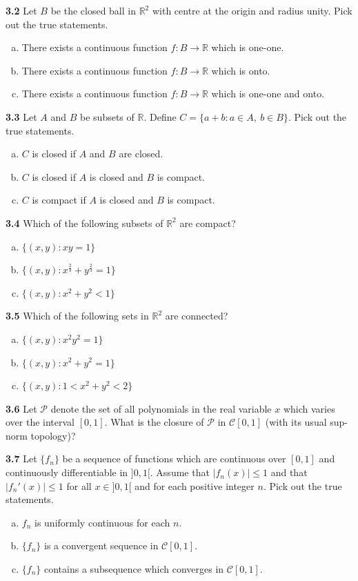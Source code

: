 \documentclass[11pt,a4paper]{article}
\newcommand{\R}{\mathbb{R}}
\newcommand{\qitem}[1]{\par\medskip\noindent\textbf{#1}\hspace{0.5em}}
\begin{document}
\qitem{3.2} Let $B$ be the closed ball in $\R^2$ with centre at the origin and radius unity. Pick out the true statements.
\begin{enumerate}[(a)]
  \item There exists a continuous function $f : B \to \R$ which is one-one.
  \item There exists a continuous function $f : B \to \R$ which is onto.
  \item There exists a continuous function $f : B \to \R$ which is one-one and onto.
\end{enumerate}

\qitem{3.3} Let $A$ and $B$ be subsets of $\R$. Define $C = \{a + b : a \in A,\ b \in B\}$. Pick out the true statements.
\begin{enumerate}[(a)]
  \item $C$ is closed if $A$ and $B$ are closed.
  \item $C$ is closed if $A$ is closed and $B$ is compact.
  \item $C$ is compact if $A$ is closed and $B$ is compact.
\end{enumerate}

\qitem{3.4} Which of the following subsets of $\R^2$ are compact?
\begin{enumerate}[(a)]
  \item $\{(x, y) : xy = 1\}$
  \item $\{(x, y) : x^{\frac{2}{3}} + y^{\frac{2}{3}} = 1\}$
  \item $\{(x, y) : x^2 + y^2 < 1\}$
\end{enumerate}

\qitem{3.5} Which of the following sets in $\R^2$ are connected?
\begin{enumerate}[(a)]
  \item $\{(x, y) : x^2 y^2 = 1\}$
  \item $\{(x, y) : x^2 + y^2 = 1\}$
  \item $\{(x, y) : 1 < x^2 + y^2 < 2\}$
\end{enumerate}

\qitem{3.6} Let $\mathcal{P}$ denote the set of all polynomials in the real variable $x$ which varies over the interval $[0, 1]$. What is the closure of $\mathcal{P}$ in $\mathcal{C}[0, 1]$ (with its usual sup-norm topology)?

\qitem{3.7} Let $\{f_n\}$ be a sequence of functions which are continuous over $[0, 1]$ and continuously differentiable in $]0, 1[$. Assume that $|f_n(x)| \le 1$ and that $|f_n'(x)| \le 1$ for all $x \in ]0, 1[$ and for each positive integer $n$. Pick out the true statements.
\begin{enumerate}[(a)]
  \item $f_n$ is uniformly continuous for each $n$.
  \item $\{f_n\}$ is a convergent sequence in $\mathcal{C}[0, 1]$.
  \item $\{f_n\}$ contains a subsequence which converges in $\mathcal{C}[0, 1]$.
\end{enumerate}
\end{document}
